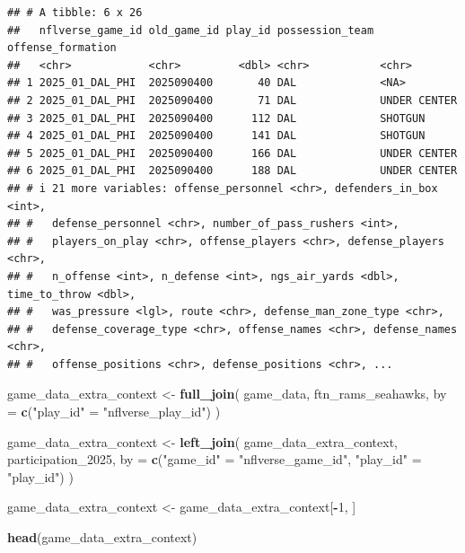 \documentclass[
]{article}
\newenvironment{Shaded}{\begin{snugshade}}{\end{snugshade}}
\newcommand{\AttributeTok}[1]{\textcolor[rgb]{0.13,0.29,0.53}{#1}}
\newcommand{\DecValTok}[1]{\textcolor[rgb]{0.00,0.00,0.81}{#1}}
\newcommand{\FunctionTok}[1]{\textcolor[rgb]{0.13,0.29,0.53}{\textbf{#1}}}
\newcommand{\NormalTok}[1]{#1}
\newcommand{\OtherTok}[1]{\textcolor[rgb]{0.56,0.35,0.01}{#1}}
\newcommand{\SpecialCharTok}[1]{\textcolor[rgb]{0.81,0.36,0.00}{\textbf{#1}}}
\newcommand{\StringTok}[1]{\textcolor[rgb]{0.31,0.60,0.02}{#1}}
\begin{document}
\begin{verbatim}
## # A tibble: 6 x 26
##   nflverse_game_id old_game_id play_id possession_team offense_formation
##   <chr>            <chr>         <dbl> <chr>           <chr>            
## 1 2025_01_DAL_PHI  2025090400       40 DAL             <NA>             
## 2 2025_01_DAL_PHI  2025090400       71 DAL             UNDER CENTER     
## 3 2025_01_DAL_PHI  2025090400      112 DAL             SHOTGUN          
## 4 2025_01_DAL_PHI  2025090400      141 DAL             SHOTGUN          
## 5 2025_01_DAL_PHI  2025090400      166 DAL             UNDER CENTER     
## 6 2025_01_DAL_PHI  2025090400      188 DAL             UNDER CENTER     
## # i 21 more variables: offense_personnel <chr>, defenders_in_box <int>,
## #   defense_personnel <chr>, number_of_pass_rushers <int>,
## #   players_on_play <chr>, offense_players <chr>, defense_players <chr>,
## #   n_offense <int>, n_defense <int>, ngs_air_yards <dbl>, time_to_throw <dbl>,
## #   was_pressure <lgl>, route <chr>, defense_man_zone_type <chr>,
## #   defense_coverage_type <chr>, offense_names <chr>, defense_names <chr>,
## #   offense_positions <chr>, defense_positions <chr>, ...
\end{verbatim}

\begin{Shaded}
\begin{Highlighting}[]
\NormalTok{game\_data\_extra\_context }\OtherTok{\textless{}{-}} \FunctionTok{full\_join}\NormalTok{(}
\NormalTok{  game\_data,}
\NormalTok{  ftn\_rams\_seahawks,}
  \AttributeTok{by =} \FunctionTok{c}\NormalTok{(}\StringTok{"play\_id"} \OtherTok{=} \StringTok{"nflverse\_play\_id"}\NormalTok{)}
\NormalTok{)}


\NormalTok{game\_data\_extra\_context }\OtherTok{\textless{}{-}} \FunctionTok{left\_join}\NormalTok{(}
\NormalTok{  game\_data\_extra\_context,}
\NormalTok{  participation\_2025,}
  \AttributeTok{by =} \FunctionTok{c}\NormalTok{(}\StringTok{"game\_id"} \OtherTok{=} \StringTok{"nflverse\_game\_id"}\NormalTok{,}
         \StringTok{"play\_id"} \OtherTok{=} \StringTok{"play\_id"}\NormalTok{)}
\NormalTok{)}


\NormalTok{game\_data\_extra\_context }\OtherTok{\textless{}{-}}\NormalTok{ game\_data\_extra\_context[}\SpecialCharTok{{-}}\DecValTok{1}\NormalTok{, ]}

\FunctionTok{head}\NormalTok{(game\_data\_extra\_context)}
\end{Highlighting}
\end{Shaded}
\end{document}

